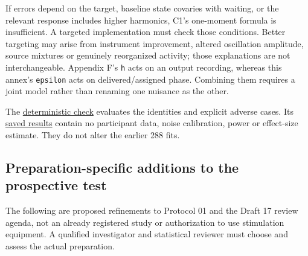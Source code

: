 \documentclass[
  american,
  11pt,
  letterpaper,
]{article}
\begin{document}
If errors depend on the target, baseline state covaries with waiting, or the relevant response includes higher harmonics, C1's one-moment formula is insufficient. A targeted implementation must check those conditions. Better targeting may arise from instrument improvement, altered oscillation amplitude, source mixtures or genuinely reorganized activity; those explanations are not interchangeable. Appendix F's \texttt{h} acts on an output recording, whereas this annex's \texttt{epsilon} acts on delivered/assigned phase. Combining them requires a joint model rather than renaming one nuisance as the other.

The \href{https://github.com/v5ma/v5ma.github.io/blob/master/papers/companions/learning-to-feel-v1.0/ARTIFACT-AVAILABILITY.md#artifact-25}{deterministic check} evaluates the identities and explicit adverse cases. Its \href{https://github.com/v5ma/v5ma.github.io/blob/master/papers/companions/learning-to-feel-v1.0/ARTIFACT-AVAILABILITY.md#artifact-26}{saved results} contain no participant data, noise calibration, power or effect-size estimate. They do not alter the earlier 288 fits.

\subsection{Preparation-specific additions to the prospective test}\label{preparation-specific-additions-to-the-prospective-test}

The following are proposed refinements to Protocol 01 and the Draft 17 review agenda, not an already registered study or authorization to use stimulation equipment. A qualified investigator and statistical reviewer must choose and assess the actual preparation.
\end{document}
